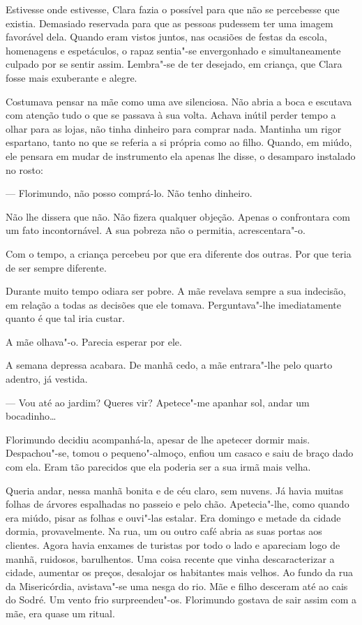 Estivesse onde estivesse, Clara fazia o possível para que não se
percebesse que existia. Demasiado reservada para que as pessoas pudessem
ter uma imagem favorável dela. Quando eram vistos juntos, nas ocasiões
de festas da escola, homenagens e espetáculos, o rapaz sentia"-se
envergonhado e simultaneamente culpado por se sentir assim. Lembra"-se de
ter desejado, em criança, que Clara fosse mais exuberante e alegre.

Costumava pensar na mãe como uma ave silenciosa. Não abria a boca e
escutava com atenção tudo o que se passava à sua volta. Achava inútil
perder tempo a olhar para as lojas, não tinha dinheiro para comprar
nada. Mantinha um rigor espartano, tanto no que se referia a si própria
como ao filho. Quando, em miúdo, ele pensara em mudar de instrumento ela
apenas lhe disse, o desamparo instalado no rosto:

--- Florimundo, não posso comprá-lo. Não tenho dinheiro.

Não lhe dissera que não. Não fizera qualquer objeção. Apenas o
confrontara com um fato incontornável. A sua pobreza não o permitia,
acrescentara"-o.

Com o tempo, a criança percebeu por que era diferente dos outras. Por que
teria de ser sempre diferente.

Durante muito tempo odiara ser pobre. A mãe revelava sempre a sua
indecisão, em relação a todas as decisões que ele tomava. Perguntava"-lhe
imediatamente quanto é que tal iria custar.

A mãe olhava"-o. Parecia esperar por ele.

A semana depressa acabara. De manhã cedo, a mãe entrara"-lhe pelo quarto
adentro, já vestida.

--- Vou até ao jardim? Queres vir? Apetece"-me apanhar sol, andar um
bocadinho\ldots{}

Florimundo decidiu acompanhá-la, apesar de lhe apetecer dormir mais.
Despachou"-se, tomou o pequeno"-almoço, enfiou um casaco e saiu de braço
dado com ela. Eram tão parecidos que ela poderia ser a sua irmã mais
velha.

Queria andar, nessa manhã bonita e de céu claro, sem nuvens. Já havia
muitas folhas de árvores espalhadas no passeio e pelo chão.
Apetecia"-lhe, como quando era miúdo, pisar as folhas e ouvi"-las estalar.
Era domingo e metade da cidade dormia, provavelmente. Na rua, um ou
outro café abria as suas portas aos clientes. Agora havia enxames de
turistas por todo o lado e apareciam logo de manhã, ruidosos,
barulhentos. Uma coisa recente que vinha descaracterizar a cidade,
aumentar os preços, desalojar os habitantes mais velhos. Ao fundo da rua
da Misericórdia, avistava"-se uma nesga do rio. Mãe e filho desceram até
ao cais do Sodré. Um vento frio surpreendeu"-os. Florimundo gostava de
sair assim com a mãe, era quase um ritual.


